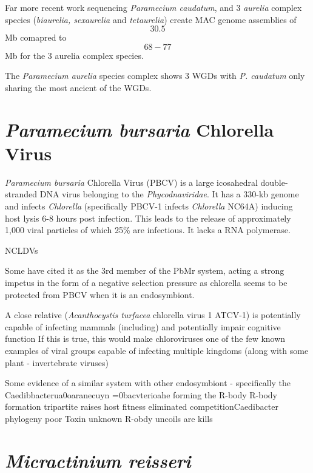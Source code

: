 Far more recent work sequencing \textit{Paramecium caudatum}, 
and 3 \textit{aurelia} complex species (\textit{biaurelia, sexaurelia} and \textit{tetaurelia})
create MAC genome assemblies of \[30.5\] Mb comapred to \[68-77\] Mb for the 3 aurelia complex species.
\citep{McGrath2014}


The \textit{Paramecium aurelia} species complex shows 3 WGDs with \textit{P. caudatum}
only sharing the most ancient of the WGDs.

\citep{McGrath2014}


\section{\textit{Paramecium bursaria} Chlorella Virus}

\textit{Paramecium bursaria} Chlorella Virus (PBCV) is a large icosahedral double-stranded DNA virus belonging to 
the \textit{Phycodnaviridae}.  It has a 330-kb genome and infects \textit{Chlorella} 
(specifically PBCV-1 infects \textit{Chlorella} NC64A) inducing host lysis 6-8 hours post infection.
This leads to the release of approximately 1,000 viral particles of which 25\% are infectious. 
It lacks a RNA polymerase. \citep{Yanai-Balser2010}

NCLDVs 

Some have cited it as the 3rd member of the PbMr system, acting a strong impetus in the form of a negative
selection pressure as chlorella seems to be protected from PBCV when it is an endosymbiont.


A close relative (\textit{Acanthocystis turfacea} chlorella virus 1 ATCV-1) is potentially capable of 
infecting mammals (including) and potentially impair cognitive function
If this is true, this would make chloroviruses one of the few known examples of viral groups capable of infecting 
multiple kingdoms (along with some plant - invertebrate viruses) \citep{Yolken2014}


Some evidence of a similar system with other endosymbiont - specifically the Caedibbacterua0oaranecuyn =0bacvterioahe
forming the R-body
R-body formation tripartite raises host fitness eliminated competitionCaedibacter phylogeny poor Toxin unknown
R-obdy uncoils are kills  \citep{Schrallhammer2009}




\section{\textit{Micractinium reisseri}}

